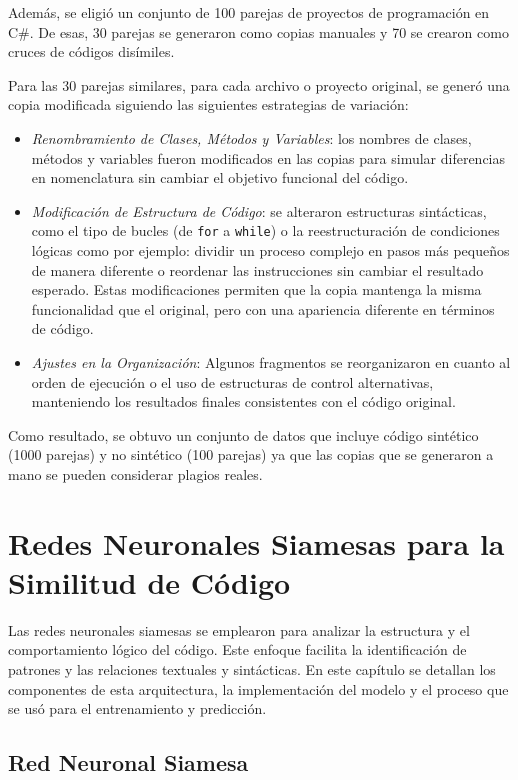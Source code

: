 Además, se eligió un conjunto de 100 parejas de proyectos de programación en C\#. De esas, 30 parejas se generaron como copias manuales y 70 se crearon como cruces de códigos disímiles.

Para las 30 parejas similares, para cada archivo o proyecto original, se generó una copia modificada siguiendo las siguientes estrategias de variación:
    \begin{itemize}
        \item \textit{Renombramiento de Clases, Métodos y Variables}: los nombres de clases, métodos y variables fueron modificados en las copias para simular diferencias en nomenclatura sin cambiar el objetivo funcional del código.
        \item \textit{Modificación de Estructura de Código}: se alteraron estructuras sintácticas, como el tipo de bucles (de \texttt{for} a \texttt{while}) o la reestructuración de condiciones lógicas como por ejemplo: dividir un proceso complejo en pasos más pequeños de manera diferente o reordenar las instrucciones sin cambiar el resultado esperado. Estas modificaciones permiten que la copia mantenga la misma funcionalidad que el original, pero con una apariencia diferente en términos de código.
        \item \textit{Ajustes en la Organización}: Algunos fragmentos se reorganizaron en cuanto al orden de ejecución o el uso de estructuras de control alternativas, manteniendo los resultados finales consistentes con el código original.
    \end{itemize}

Como resultado, se obtuvo un conjunto de datos que incluye código sintético (1000 parejas) y no sintético (100 parejas) ya que las copias que se generaron a mano se pueden considerar plagios reales.


\chapter{Redes Neuronales Siamesas para la Similitud de Código}\label{chapter:proposal}

Las redes neuronales siamesas se emplearon para analizar la estructura y el comportamiento lógico del código. Este enfoque facilita la identificación de patrones y las relaciones textuales y sintácticas. En este capítulo se detallan los componentes de esta arquitectura, la implementación del modelo y el proceso que se usó para el entrenamiento y predicción.

\section{Red Neuronal Siamesa}

